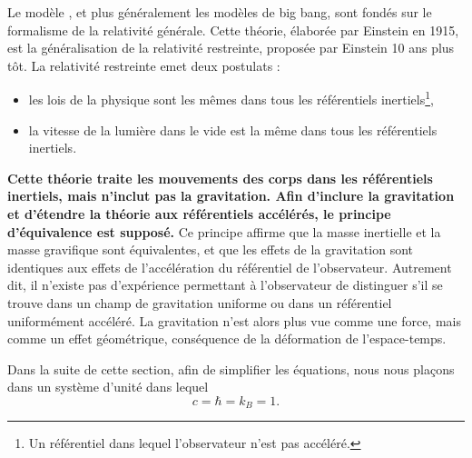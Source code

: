 \documentclass[11pt, twoside, a4paper, openright]{report}
\begin{document}
Le modèle \lcdm{}, et plus généralement les modèles de big bang, sont fondés sur le formalisme de la relativité générale.
Cette théorie, élaborée par Einstein en 1915, est la généralisation de la relativité restreinte, proposée par Einstein 10 ans plus tôt. La relativité restreinte emet deux postulats :
  \begin{itemize}[label=$\bullet$]
  \item les lois de la physique sont les mêmes dans tous les référentiels inertiels\footnote{Un référentiel dans lequel l'observateur n'est pas accéléré.},
  \item la vitesse de la lumière dans le vide est la même dans tous les référentiels inertiels.
  \end{itemize}
\textbf{Cette théorie traite les mouvements des corps dans les référentiels inertiels, mais n'inclut pas la gravitation. Afin d'inclure la gravitation et d'étendre la théorie aux référentiels accélérés, le principe d'équivalence est supposé.}
Ce principe affirme que la masse inertielle et la masse gravifique sont équivalentes, et que les effets de la gravitation sont identiques aux effets de l'accélération du référentiel de l'observateur. Autrement dit, il n'existe pas d'expérience permettant à l'observateur de distinguer s'il se trouve dans un champ de gravitation uniforme ou dans un référentiel uniformément accéléré. La gravitation n'est alors plus vue comme une force, mais comme un effet géométrique, conséquence de la déformation de l'espace-temps.

Dans la suite de cette section, afin de simplifier les équations, nous nous plaçons dans un système d'unité dans lequel
  \begin{equation}
    c = \hbar = k_{B} = 1 .
  \end{equation}
\end{document}
